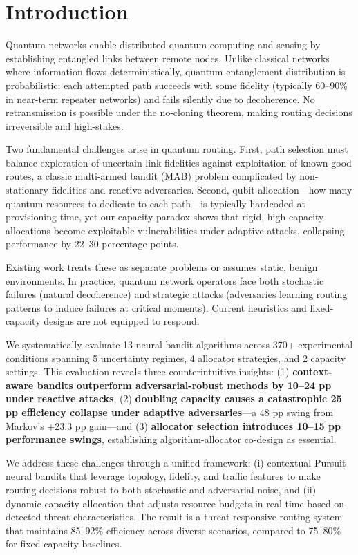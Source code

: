 \documentclass[10pt,twocolumn,journal]{IEEEtran}
\begin{document}
\IEEEpeerreviewmaketitle

\section{Introduction}
\label{sec:introduction}

Quantum networks enable distributed quantum computing and sensing by establishing entangled links between remote nodes. Unlike classical networks where information flows deterministically, quantum entanglement distribution is probabilistic: each attempted path succeeds with some fidelity (typically 60--90\% in near-term repeater networks) and fails silently due to decoherence. No retransmission is possible under the no-cloning theorem, making routing decisions irreversible and high-stakes.

Two fundamental challenges arise in quantum routing. First, path selection must balance exploration of uncertain link fidelities against exploitation of known-good routes, a classic multi-armed bandit (MAB) problem complicated by non-stationary fidelities and reactive adversaries. Second, qubit allocation—how many quantum resources to dedicate to each path—is typically hardcoded at provisioning time, yet our capacity paradox shows that rigid, high-capacity allocations become exploitable vulnerabilities under adaptive attacks, collapsing performance by 22--30 percentage points.

Existing work treats these as separate problems or assumes static, benign environments. In practice, quantum network operators face both stochastic failures (natural decoherence) and strategic attacks (adversaries learning routing patterns to induce failures at critical moments). Current heuristics and fixed-capacity designs are not equipped to respond.

We systematically evaluate 13 neural bandit algorithms across 370+ experimental conditions spanning 5 uncertainty regimes, 4 allocator strategies, and 2 capacity settings. This evaluation reveals three counterintuitive insights: (1) \textbf{context-aware bandits outperform adversarial-robust methods by 10--24 pp under reactive attacks}, (2) \textbf{doubling capacity causes a catastrophic 25 pp efficiency collapse under adaptive adversaries}—a 48 pp swing from Markov's +23.3 pp gain—and (3) \textbf{allocator selection introduces 10--15 pp performance swings}, establishing algorithm-allocator co-design as essential.

We address these challenges through a unified framework: (i) contextual Pursuit neural bandits that leverage topology, fidelity, and traffic features to make routing decisions robust to both stochastic and adversarial noise, and (ii) dynamic capacity allocation that adjusts resource budgets in real time based on detected threat characteristics. The result is a threat-responsive routing system that maintains 85--92\% efficiency across diverse scenarios, compared to 75--80\% for fixed-capacity baselines.
\end{document}
